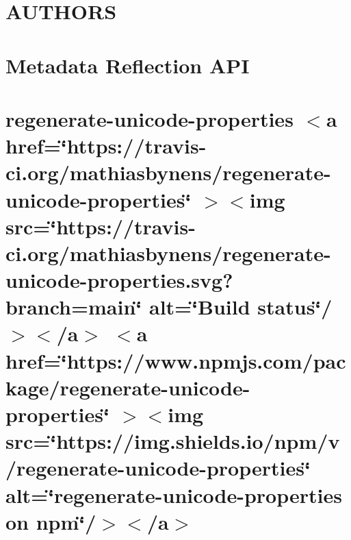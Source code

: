\documentclass[twoside]{book}
\newcommand{\+}{\discretionary{\mbox{\scriptsize$\hookleftarrow$}}{}{}}
\begin{document}
\chapter{AUTHORS}
\label{md__c___users_vaishnavi_jadhav__desktop__developer_code_mean_stack_example_client_node_modules_reflect_metadata__a_u_t_h_o_r_s}

\chapter{Metadata Reflection API}
\label{md__c___users_vaishnavi_jadhav__desktop__developer_code_mean_stack_example_client_node_modules_reflect_metadata__r_e_a_d_m_e}

\chapter{regenerate-\/unicode-\/properties \texorpdfstring{$<$}{<}a href=\char`\"{}https\+://travis-\/ci.\+org/mathiasbynens/regenerate-\/unicode-\/properties\char`\"{} \texorpdfstring{$>$}{>}\texorpdfstring{$<$}{<}img src=\char`\"{}https\+://travis-\/ci.\+org/mathiasbynens/regenerate-\/unicode-\/properties.\+svg?branch=main\char`\"{} alt=\char`\"{}\+Build status\char`\"{}/\texorpdfstring{$>$}{>}\texorpdfstring{$<$}{<}/a\texorpdfstring{$>$}{>} \texorpdfstring{$<$}{<}a href=\char`\"{}https\+://www.\+npmjs.\+com/package/regenerate-\/unicode-\/properties\char`\"{} \texorpdfstring{$>$}{>}\texorpdfstring{$<$}{<}img src=\char`\"{}https\+://img.\+shields.\+io/npm/v/regenerate-\/unicode-\/properties\char`\"{} alt=\char`\"{}regenerate-\/unicode-\/properties on npm\char`\"{}/\texorpdfstring{$>$}{>}\texorpdfstring{$<$}{<}/a\texorpdfstring{$>$}{>}}
\label{md__c___users_vaishnavi_jadhav__desktop__developer_code_mean_stack_example_client_node_modules_r255cca1dc1d574eb0f1345e1d5dd8850}

\end{document}

